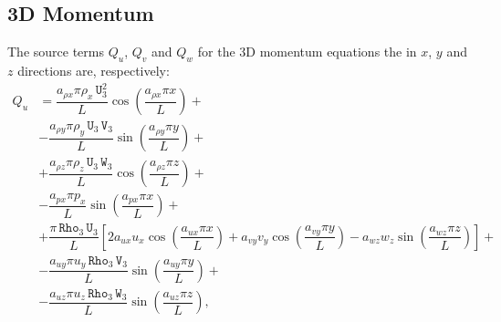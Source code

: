 \documentclass[10pt]{article}
\newcommand{\Rho}{\,\mathtt{Rho}}
\newcommand{\U}{\,\mathtt{U}}
\newcommand{\V}{\,\mathtt{V}}
\newcommand{\W}{\,\mathtt{W}}
\begin{document}
\subsection{3D Momentum}

The source terms $Q_{u}$, $Q_{v}$ and $Q_{w}$ for the 3D momentum equations the in $x$, $y$ and $z$ directions are, respectively:
%
\begin{equation}
 \begin{split}
Q_u &= \dfrac{a_{\rho x} \pi \rho_x \U_3^2 }{L}\cos\left(\dfrac{a_{\rho x} \pi x}{L}\right)+\\
&-\dfrac{a_{\rho y} \pi \rho_y \U_3 \V_3 }{L}\sin\left(\dfrac{a_{\rho y} \pi y}{L}\right)+\\
&+\dfrac{a_{\rho z} \pi \rho_z \U_3 \W_3 }{L}\cos\left(\dfrac{a_{\rho z}\pi z }{L}\right)+\\
&-\dfrac{a_{px} \pi p_x }{L}\sin\left(\dfrac{a_{px} \pi x}{L}\right)+\\
&+\dfrac{\pi \Rho_3 \U_3}{L}\left[2 a_{ux} u_x \cos\left(\dfrac{a_{ux} \pi x}{L}\right)+a_{vy} v_y \cos\left(\dfrac{a_{vy} \pi y}{L}\right)-a_{wz} w_z \sin\left(\dfrac{a_{wz}\pi z }{L}\right)\right]+\\
&-\dfrac{a_{uy} \pi u_y \Rho_3 \V_3}{L} \sin\left(\dfrac{a_{uy} \pi y}{L}\right)+\\
&-\dfrac{a_{uz} \pi u_z \Rho_3 \W_3 }{L}\sin\left(\dfrac{a_{uz}\pi z }{L}\right),
 \end{split}
\end{equation}
\end{document}
